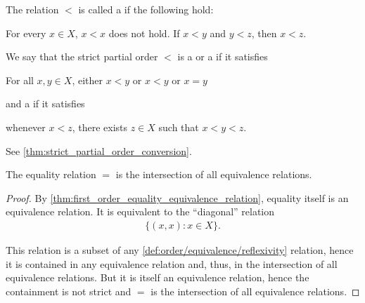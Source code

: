 \begin{definition}
\begin{defenum}
    \item\label{def:order/strict_partial}\cite[168]{Enderton1977} The relation $<$ is called a  if the following hold:
    \begin{description}
       For every $x \in X$, $x < x$ does not hold.
       If $x < y$ and $y < z$, then $x < z$.
    \end{description}

    We say that the strict partial order $<$ is a  or a  if it satisfies
    \begin{description}
       For all $x, y \in X$, either $x < y$ or $x < y$ or $x = y$
    \end{description}
    and a  if it satisfies
    \begin{description}
       whenever $x < z$, there exists $z \in X$ such that $x < y < z$.
    \end{description}

    See \cref{thm:strict_partial_order_conversion}.
  \end{defenum}
\end{definition}

\begin{proposition}\label{thm:equality_is_smallest_equivalence_relation}
  The equality relation $=$ is the intersection of all equivalence relations.
\end{proposition}
\begin{proof}
  By \cref{thm:first_order_equality_equivalence_relation}, equality itself is an equivalence relation. It is equivalent to the \enquote{diagonal} relation
  \begin{align*}
    \{ (x, x) \colon x \in X \}.
  \end{align*}

  This relation is a subset of any \ref{def:order/equivalence/reflexivity} relation, hence it is contained in any equivalence relation and, thus, in the intersection of all equivalence relations. But it is itself an equivalence relation, hence the containment is not strict and $=$ is the intersection of all equivalence relations.
\end{proof}

